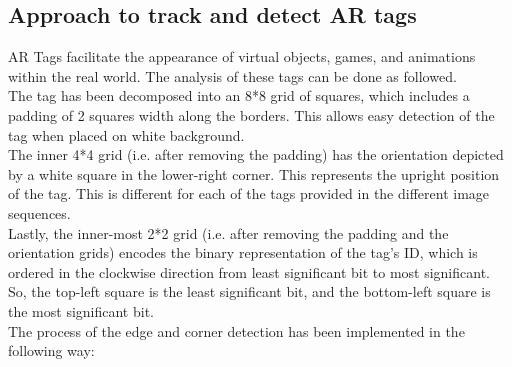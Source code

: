 \documentclass{article}
\begin{document}
\subsection{Approach to track and detect AR tags}
AR Tags facilitate the appearance of virtual objects, games, and animations within the real world. The analysis of these tags can be done as followed.\\

The tag has been decomposed into an 8*8 grid of squares, which includes a padding of 2 squares width along the borders. This allows easy detection of the tag when placed on white background.\\
The inner 4*4 grid (i.e. after removing the padding) has the orientation depicted by a white square in the lower-right corner. This represents the upright position of the tag. This is different for each of the tags provided in the different image sequences.\\

Lastly, the inner-most 2*2 grid (i.e. after removing the padding and the orientation grids) encodes the binary representation of the tag’s ID, which is ordered in the clockwise direction from least significant bit to most significant. So, the top-left square is the least significant bit, and the bottom-left square is the most significant bit.\\




The process of the edge and corner detection has been implemented in the following way:
\end{document}
